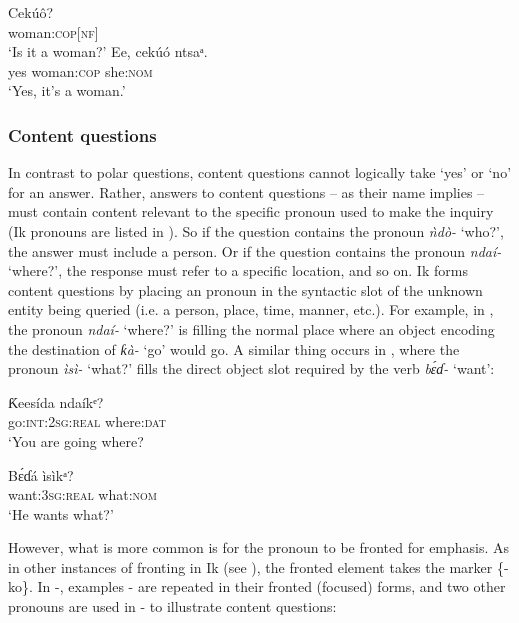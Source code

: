 \ea\label{ex:syn:45}
  \ea
  \gll Cekú{ô}? \\
woman:\textsc{cop[nf]}    \\
  \glt ‘Is it a woman?’    
  \ex
  \gll Ee, cekúó     ntsaᵃ. \\
     yes woman:\textsc{cop}   she:\textsc{nom}    \\
  \glt ‘Yes, it’s a woman.’
  \z
\z





\subsubsection{Content questions}\label{sec:10.4.3}

In contrast to polar questions, content questions cannot logically take ‘yes’ or ‘no’ for an answer. Rather, answers to content questions – as their name implies – must contain content relevant to the specific  pronoun used to make the inquiry (Ik  pronouns are listed in ). So if the question contains the pronoun \textit{ǹdò-} ‘who?’, the answer must include a person. Or if the question contains the pronoun \textit{ndaí-} ‘where?’, the response must refer to a specific location, and so on. Ik forms content questions by placing an  pronoun in the syntactic slot of the unknown entity being queried (i.e. a person, place, time, manner, etc.). For example, in , the  pronoun \textit{ndaí-} ‘where?’ is filling the normal place where an object encoding the destination of \textit{ƙà-} ‘go’ would go. A similar thing occurs in , where the pronoun \textit{ìsì-} ‘what?’ fills the direct object slot required by the verb \textit{b\'{ɛ}ɗ-} ‘want’:




\ea\label{ex:syn:46}
\gll Ƙeesída     ndaíkᵉ? \\
go:\textsc{int:2sg:real}   where:\textsc{dat}    \\
\glt ‘You are going where? 
\z




\ea\label{ex:syn:47}
\gll B\'{ɛ}ɗá       ìsìkᵃ? \\
want:\textsc{3sg:real}   what:\textsc{nom}    \\
\glt ‘He wants what?’ 
\z


However, what is more common is for the  pronoun to be fronted for emphasis. As in other instances of fronting in Ik (see ), the fronted element takes the  marker \{-ko\}. In -, examples - are repeated in their fronted (focused) forms, and two other  pronouns are used in - to illustrate content questions:



